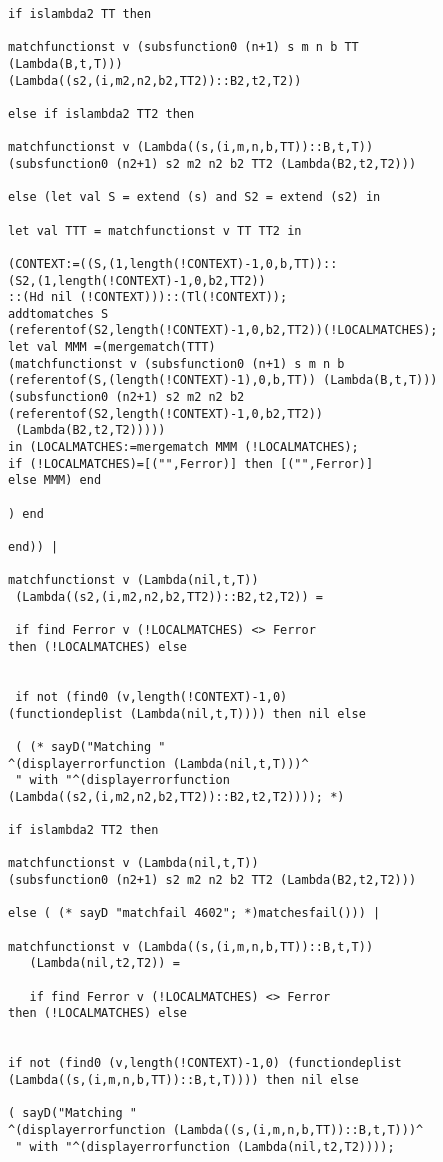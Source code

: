 \documentclass[12pt]{article}
\begin{document}
\begin{verbatim}
if islambda2 TT then

matchfunctionst v (subsfunction0 (n+1) s m n b TT 
(Lambda(B,t,T)))
(Lambda((s2,(i,m2,n2,b2,TT2))::B2,t2,T2))

else if islambda2 TT2 then

matchfunctionst v (Lambda((s,(i,m,n,b,TT))::B,t,T)) 
(subsfunction0 (n2+1) s2 m2 n2 b2 TT2 (Lambda(B2,t2,T2)))

else (let val S = extend (s) and S2 = extend (s2) in

let val TTT = matchfunctionst v TT TT2 in

(CONTEXT:=((S,(1,length(!CONTEXT)-1,0,b,TT))::
(S2,(1,length(!CONTEXT)-1,0,b2,TT2))
::(Hd nil (!CONTEXT)))::(Tl(!CONTEXT));
addtomatches S 
(referentof(S2,length(!CONTEXT)-1,0,b2,TT2))(!LOCALMATCHES);
let val MMM =(mergematch(TTT)
(matchfunctionst v (subsfunction0 (n+1) s m n b 
(referentof(S,(length(!CONTEXT)-1),0,b,TT)) (Lambda(B,t,T)))
(subsfunction0 (n2+1) s2 m2 n2 b2 
(referentof(S2,length(!CONTEXT)-1,0,b2,TT2))
 (Lambda(B2,t2,T2)))))
in (LOCALMATCHES:=mergematch MMM (!LOCALMATCHES);
if (!LOCALMATCHES)=[("",Ferror)] then [("",Ferror)]
else MMM) end 

) end

end)) |

matchfunctionst v (Lambda(nil,t,T)) 
 (Lambda((s2,(i,m2,n2,b2,TT2))::B2,t2,T2)) =
 
 if find Ferror v (!LOCALMATCHES) <> Ferror 
then (!LOCALMATCHES) else

 
 if not (find0 (v,length(!CONTEXT)-1,0) 
(functiondeplist (Lambda(nil,t,T)))) then nil else
 
 ( (* sayD("Matching "
^(displayerrorfunction (Lambda(nil,t,T)))^
 " with "^(displayerrorfunction 
(Lambda((s2,(i,m2,n2,b2,TT2))::B2,t2,T2)))); *)

if islambda2 TT2 then

matchfunctionst v (Lambda(nil,t,T))
(subsfunction0 (n2+1) s2 m2 n2 b2 TT2 (Lambda(B2,t2,T2))) 

else ( (* sayD "matchfail 4602"; *)matchesfail())) |

matchfunctionst v (Lambda((s,(i,m,n,b,TT))::B,t,T))
   (Lambda(nil,t2,T2)) = 
   
   if find Ferror v (!LOCALMATCHES) <> Ferror 
then (!LOCALMATCHES) else

   
if not (find0 (v,length(!CONTEXT)-1,0) (functiondeplist 
(Lambda((s,(i,m,n,b,TT))::B,t,T)))) then nil else
   
( sayD("Matching "
^(displayerrorfunction (Lambda((s,(i,m,n,b,TT))::B,t,T)))^
 " with "^(displayerrorfunction (Lambda(nil,t2,T2)))); 


\end{verbatim}
\end{document}
